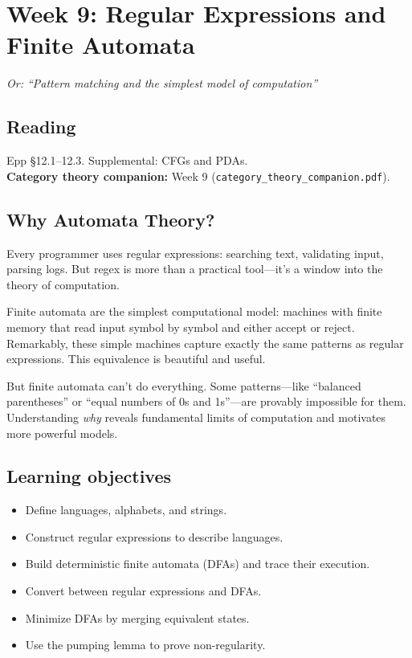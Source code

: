 \section{Week 9: Regular Expressions and Finite Automata}

\textit{Or: ``Pattern matching and the simplest model of computation''}

\subsection*{Reading}
Epp \S 12.1--12.3. Supplemental: CFGs and PDAs.\\
\textbf{Category theory companion:} Week 9 (\texttt{category\_theory\_companion.pdf}).

\subsection*{Why Automata Theory?}

Every programmer uses regular expressions: searching text, validating input, parsing logs. But regex is more than a practical tool---it's a window into the theory of computation.

Finite automata are the simplest computational model: machines with finite memory that read input symbol by symbol and either accept or reject. Remarkably, these simple machines capture exactly the same patterns as regular expressions. This equivalence is beautiful and useful.

But finite automata can't do everything. Some patterns---like ``balanced parentheses'' or ``equal numbers of 0s and 1s''---are provably impossible for them. Understanding \emph{why} reveals fundamental limits of computation and motivates more powerful models.

\subsection*{Learning objectives}
\begin{itemize}
  \item Define languages, alphabets, and strings.
  \item Construct regular expressions to describe languages.
  \item Build deterministic finite automata (DFAs) and trace their execution.
  \item Convert between regular expressions and DFAs.
  \item Minimize DFAs by merging equivalent states.
  \item Use the pumping lemma to prove non-regularity.
\end{itemize}

